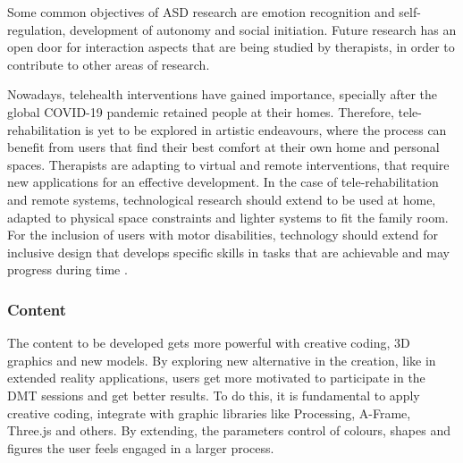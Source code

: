 \documentclass[a4paper,fleqn]{cas-sc}
\begin{document}
Some common objectives of ASD research are emotion recognition and self-regulation, development of autonomy and social initiation. Future research has an open door for interaction aspects that are being studied by therapists, in order to contribute to other areas of research.

Nowadays, telehealth interventions have gained importance, specially after the global COVID-19 pandemic retained people at their homes. Therefore, tele-rehabilitation is yet to be explored in artistic endeavours, where the process can benefit from users that find their best comfort at their own home and personal spaces. Therapists are adapting to virtual and remote interventions, that require new applications for an effective development.  In the case of tele-rehabilitation and remote systems, technological research should extend to be used at home, adapted to physical space constraints and lighter systems to fit the family room. For the inclusion of users with motor disabilities, technology should extend for inclusive design that develops specific skills in tasks that are achievable and may progress during time \cite{Vargas20}.


\subsubsection{Content}

The content to be developed gets more powerful with creative coding, 3D graphics and new models. By exploring new alternative in the creation, like in extended reality applications, users get more motivated to participate in the DMT sessions and get better results. To do this, it is fundamental to apply creative coding, integrate with graphic libraries like Processing, A-Frame, Three.js and others. By extending, the parameters control of colours, shapes and figures the user feels engaged in a larger process.
\end{document}
